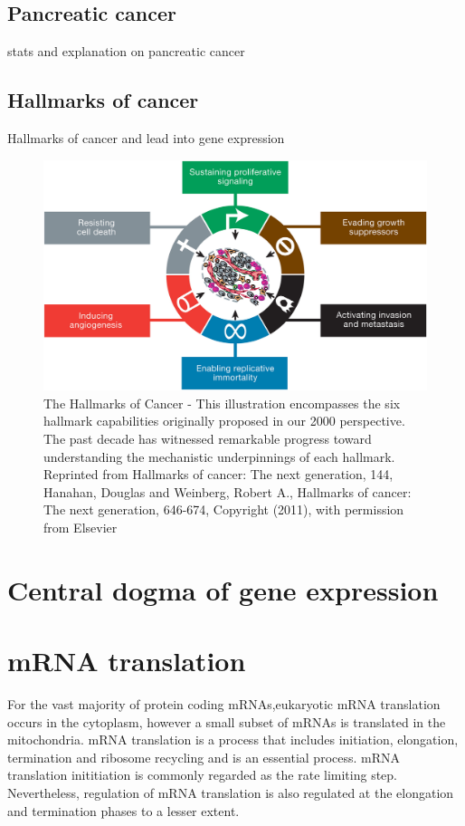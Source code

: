 \documentclass[12pt,openany]{book}
\begin{document}
\subsection{Pancreatic cancer}

stats and explanation on pancreatic cancer

\subsection{Hallmarks of cancer}

Hallmarks of cancer and lead into gene expression

\begin{figure}
  \includegraphics{./figures/hallmarks.jpg}
  \caption{The Hallmarks of Cancer - This illustration encompasses the six hallmark capabilities originally proposed in our 2000 perspective. The past decade has witnessed remarkable progress toward understanding the mechanistic underpinnings of each hallmark. 
  Reprinted from Hallmarks of cancer: The next generation, 144, Hanahan, Douglas and Weinberg, Robert A., Hallmarks of cancer: The next generation, 646-674, Copyright (2011), with permission from Elsevier \label{HOC}}
\end{figure}

\section{Central dogma of gene expression}

\section{mRNA translation}

For the vast majority of protein coding mRNAs,eukaryotic mRNA
translation occurs in the cytoplasm, however a small subset of mRNAs is
translated in the mitochondria. mRNA translation is a process that
includes initiation, elongation, termination and ribosome recycling and
is an essential process. mRNA translation inititiation is commonly
regarded as the rate limiting step. Nevertheless, regulation of mRNA
translation is also regulated at the elongation and termination phases
to a lesser extent.
\end{document}
